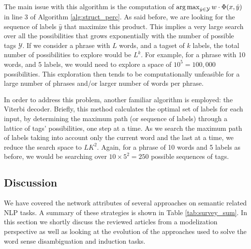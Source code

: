 The main issue with this algorithm is the computation of $\argmax_{\hat{y}\in \mathcal{Y}}w\cdot \Phi(x,\hat{y})$ in line 3 of Algorithm \ref{alg:struct_perc}. As said before, we are looking for the sequence of labels $\hat{y}$  that maximize this product. This implies a very large search over all the possibilities that grows exponentially with the number of possible tags $\mathcal{Y}$. If we consider a phrase with $L$ words, and a tagset of $k$ labels, the total number of possibilities to explore would be $L^k$. For example, for a phrase with 10 words, and 5 labels, we would need to explore a space of $10^5=100,000$ possibilities. This exploration then tends to be computationally unfeasible for a large number of phrases and/or larger number of words per phrase.

In order to address this problem, another familiar  algorithm is employed: the Viterbi decoder. Briefly, this method calculates the optimal set of labels for each input, by determining the maximum path (or sequence of labels) through a lattice of tags' possibilities, one step at a time. As we search the maximum path of labels taking into account only the current word and the last at a time, we reduce the search space to $LK^2$. Again, for a phrase of 10 words and 5 labels as before, we would be searching over $10\times 5^2=250$ possible sequences of tags.




\subsection{Discussion}\label{sec:disc_chap3}
We have covered the network attributes of several approaches on semantic related NLP tasks. A summary of these strategies is shown in Table \ref{tab:survey_sum}.
In this section we shortly discuss the reviewed articles from a  modelization perspective as well as looking at the evolution of the approaches used to solve the word sense disambiguation and induction tasks.


